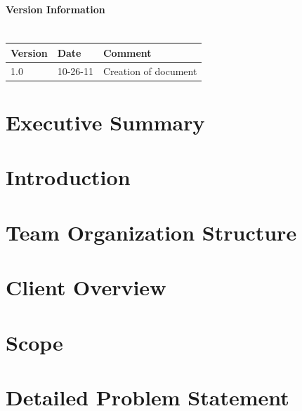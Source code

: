 \documentclass[11pt]{article}
\begin{document}
\tableofcontents			%
\setcounter{tocdepth}{1}		%

\newpage
\paragraph{Version Information\\\\} 
\begin{tabular}{|p{1.5cm}|p{1.5cm}|p{10cm}|} \hline
Version & Date & Comment \\ \hline
1.0 & 10-26-11 & Creation of document \\

\hline
\end{tabular}

\newpage
{}
\setcounter{page}{1}

\section{Executive Summary}						

\newpage
\section{Introduction}

\section{Team Organization Structure}

%
%
\section{Client Overview}

%
%
\section{Scope}

\section{Detailed Problem Statement}

%
%


\newpage

						
\end{document}
